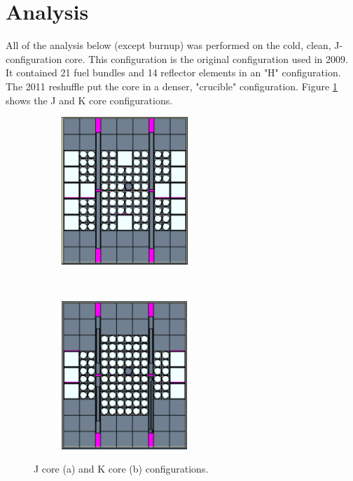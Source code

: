 \documentclass{UWNR_modeling}
\begin{document}
\section{Analysis}\label{section:analysis}
All of the analysis below (except burnup) was performed on the cold, clean, J-configuration core. This configuration is the original configuration used in 2009. It contained 21 fuel bundles and 14 reflector elements in an "H" configuration. The 2011 reshuffle put the core in a denser, "crucible" configuration. Figure \ref{fig:core_configurations} shows the J and K core configurations.

\begin{figure}[h]
    \centering
    \begin{subfigure}[t]{0.5\textwidth}
        \centering
        \includegraphics[height=2.2in]{jcore.pdf}
        \caption{}
    \end{subfigure}%
    ~ 
    \begin{subfigure}[t]{0.5\textwidth}
        \centering
        \includegraphics[height=2.2in]{kcore.pdf}
        \caption{}
    \end{subfigure}
    \caption{J core (a) and K core (b) configurations.}
    \label{fig:core_configurations}
\end{figure}
\end{document}
